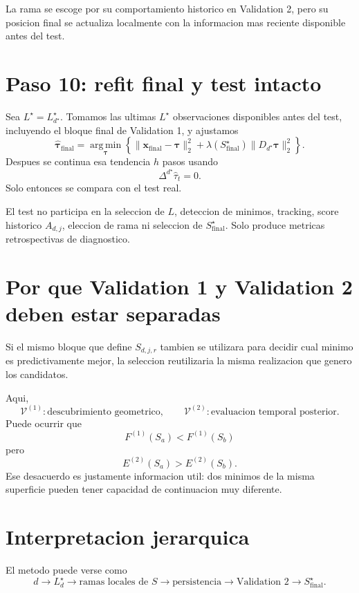 \documentclass[11pt]{article}
\newcommand{\D}{\Delta}
\newcommand{\argmin}{\operatorname*{arg\,min}}
\begin{document}
La rama se escoge por su comportamiento historico en Validation 2, pero su
posicion final se actualiza localmente con la informacion mas reciente
disponible antes del test.

\section{Paso 10: refit final y test intacto}

Sea \(L^\star=L_{d^\star}^\star\). Tomamos las ultimas \(L^\star\)
observaciones disponibles antes del test, incluyendo el bloque final de
Validation 1, y ajustamos
\begin{equation}
\widehat{\bm{\tau}}_{\mathrm{final}}
=
\argmin_{\bm{\tau}}
\left\{
\|\bm{x}_{\mathrm{final}}-\bm{\tau}\|_2^2
+
\lambda(S_{\mathrm{final}}^\star)
\|D_{d^\star}\bm{\tau}\|_2^2
\right\}.
\label{eq:finalfit}
\end{equation}
Despues se continua esa tendencia \(h\) pasos usando
\[
\D^{d^\star}\widehat{\tau}_t=0.
\]
Solo entonces se compara con el test real.

El test no participa en la seleccion de \(L\), deteccion de minimos, tracking,
score historico \(A_{d,j}\), eleccion de rama ni seleccion de
\(S_{\mathrm{final}}^\star\). Solo produce metricas retrospectivas de
diagnostico.

\section{Por que Validation 1 y Validation 2 deben estar separadas}

Si el mismo bloque que define \(S_{d,j,r}\) tambien se utilizara para decidir
cual minimo es predictivamente mejor, la seleccion reutilizaria la misma
realizacion que genero los candidatos.

Aqui,
\[
\mathcal{V}^{(1)}:
\text{descubrimiento geometrico},
\qquad
\mathcal{V}^{(2)}:
\text{evaluacion temporal posterior}.
\]
Puede ocurrir que
\[
F^{(1)}(S_a)<F^{(1)}(S_b)
\]
pero
\[
E^{(2)}(S_a)>E^{(2)}(S_b).
\]
Ese desacuerdo es justamente informacion util: dos minimos de la misma
superficie pueden tener capacidad de continuacion muy diferente.

\section{Interpretacion jerarquica}

El metodo puede verse como
\[
\boxed{
d
\to
L_d^\star
\to
\text{ramas locales de }S
\to
\text{persistencia}
\to
\text{Validation 2}
\to
S_{\mathrm{final}}^\star
}.
\]
\end{document}
